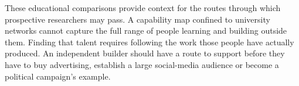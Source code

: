 These educational comparisons provide context for the routes through
which prospective researchers may pass. A capability map confined to
university networks cannot capture the full range of people learning and
building outside them. Finding that talent requires following the work
those people have actually produced. An
independent builder should have a route to support before they have to
buy advertising, establish a large social-media audience or become a
political campaign's example.
